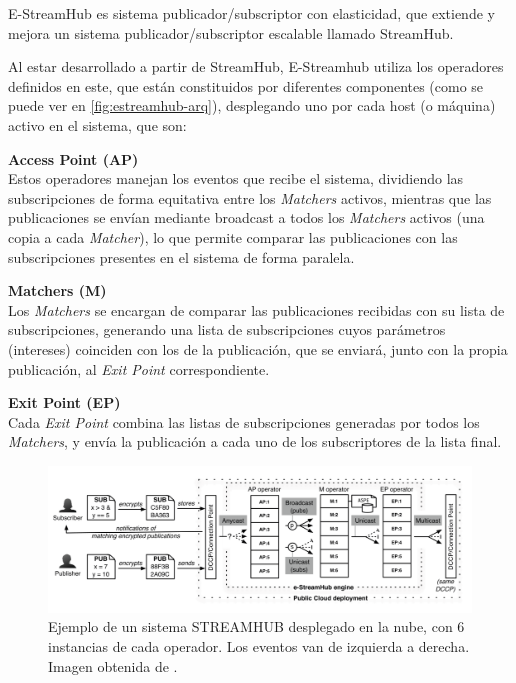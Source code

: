 E-StreamHub\cite{paper:e-streamhub} es sistema publicador/subscriptor con 
elasticidad\cite{paper:elasticity}, que extiende y mejora un sistema 
publicador/subscriptor escalable llamado StreamHub\cite{paper:streamhub}.

Al estar desarrollado a partir de StreamHub, E-Streamhub utiliza los
operadores definidos en este, que están constituidos por diferentes componentes
(como se puede ver en \autoref{fig:estreamhub-arq}), desplegando 
uno por cada host (o máquina) activo en el sistema, que son:

\textbf{Access Point (AP)}\\
Estos operadores manejan los eventos que recibe el sistema, dividiendo las subscripciones de forma
equitativa entre los \textit{Matchers} activos, mientras que las publicaciones se envían 
mediante broadcast a todos los \textit{Matchers} activos (una copia a cada \textit{Matcher}), lo que
permite comparar las publicaciones con las subscripciones presentes en el sistema de forma
paralela.

\textbf{Matchers (M)}\\
Los \textit{Matchers} se encargan de comparar las publicaciones recibidas con su lista de 
subscripciones, generando una lista de subscripciones cuyos parámetros (intereses) coinciden con los 
de la publicación, que se enviará, junto con la propia publicación, al \textit{Exit Point} 
correspondiente.

\textbf{Exit Point (EP)}\\
Cada \textit{Exit Point} combina las listas de subscripciones generadas por todos los 
\textit{Matchers}, y envía la publicación a cada uno de los subscriptores de la lista final.

\begin{figure}[htpb]
    \centering
    \includegraphics[width=\textwidth]{images/e-strueamhub-arq.png}
    \caption{Ejemplo de un sistema STREAMHUB desplegado en la nube, con 6 instancias de cada operador. Los eventos van de izquierda a derecha. Imagen obtenida de \cite{paper:e-streamhub}.}
    \label{fig:estreamhub-arq}
\end{figure}


